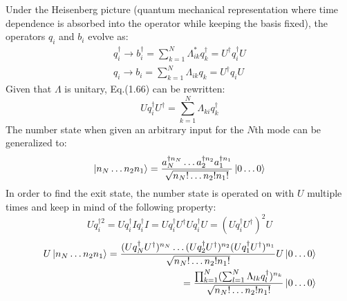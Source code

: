 Under the Heisenberg picture (quantum mechanical representation where time dependence is absorbed into the operator while keeping the basis fixed), the operators $q_{i}$ and $b_{i}$ evolve as:
\begin{eqnarray}
q_{i}^{\dagger} \rightarrow b_{i}^{\dagger} = \sum_{k=1}^{N} \Lambda_{ik}^{*}q_{k}^{\dagger} = U^{\dagger}q_{i}^{\dagger}U \\
q_{i} \rightarrow b_{i} = \sum_{k=1}^{N} \Lambda_{ik}q_{k} = U^{\dagger}q_{i}U
\end{eqnarray}
Given that $\Lambda$ is unitary, Eq.(1.66) can be rewritten:
\begin{equation}
    Uq_{i}^{\dagger}U^{\dagger} = \sum_{k=1}^{N} \Lambda_{ki}q_{k}^{\dagger}
\end{equation}
The number state when given an arbitrary input for the $N$th mode can be generalized to:
\begin{equation}
    \ket{n_{N} \dots n_{2}n_{1}} = \frac{a_{N}^{\dagger n_{N}}\dots a_{2}^{\dagger n_{2}}a_{1}^{\dagger n_{1}}}{\sqrt{n_{N}!\dots n_{2}!n_{1}!}} \ket{0\dots0}
\end{equation}
In order to find the exit state, the number state is operated on with $U$ multiple times and keep in mind of the following property:
\begin{equation}
    Uq_{i}^{\dagger 2} = Uq_{i}^{\dagger}Iq_{i}^{\dagger}I = Uq_{i}^{\dagger}U^{\dagger}Uq_{i}^{\dagger}U = (Uq_{i}^{\dagger}U^{\dagger})^{2}U
\end{equation}
\begin{eqnarray}
U\ket{n_{N} \dots n_{2}n_{1}} = \frac{(Uq_{N}^{\dagger}U^{\dagger})^{n_{N}} \dots (Uq_{2}^{\dagger}U^{\dagger})^{n_{2}}(Uq_{1}^{\dagger}U^{\dagger})^{n_{1}}}{\sqrt{n_{N}!\dots n_{2}!n_{1}!}} U \ket{0\dots0} \\
 = \frac{\prod_{k=1}^{N} (\sum_{l=1}^{N} \Lambda_{lk} q_{l}^{\dagger})^{n_{k}}}{\sqrt{n_{N}!\dots n_{2}!n_{1}!}} \ket{0 \dots 0}
\end{eqnarray}
